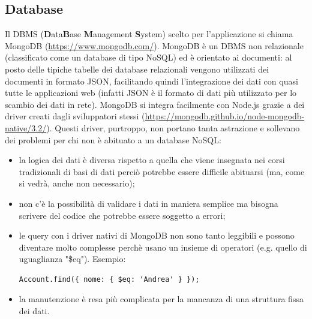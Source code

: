 \documentclass[12pt]{report}
\begin{document}
\subsection{Database}\label{sec:db}
%
Il DBMS (\textbf{D}ata\textbf{B}ase \textbf{M}anagement \textbf{S}ystem) scelto per l'applicazione si chiama MongoDB (\url{https://www.mongodb.com/}). MongoDB è un DBMS non relazionale (classificato come un database di tipo NoSQL) ed è orientato ai documenti: al posto delle tipiche tabelle dei database relazionali vengono utilizzati dei documenti in formato JSON, facilitando quindi l'integrazione dei dati con quasi tutte le applicazioni web (infatti JSON è il formato di dati più utilizzato per lo scambio dei dati in rete).
MongoDB si integra facilmente con Node.js grazie a dei driver creati dagli sviluppatori stessi (\url{https://mongodb.github.io/node-mongodb-native/3.2/}). Questi driver, purtroppo, non portano tanta astrazione e sollevano dei problemi per chi non è abituato a un database NoSQL: 
\begin{itemize}
	\item la logica dei dati è diversa rispetto a quella che viene insegnata nei corsi tradizionali di basi di dati perciò potrebbe essere difficile abituarsi (ma, come si vedrà, anche non necessario);
	\item non c'è la possibilità di validare i dati in maniera semplice ma bisogna scrivere del codice che potrebbe essere soggetto a errori;
	\item le query con i driver nativi di MongoDB non sono tanto leggibili e possono diventare molto complesse perchè usano un insieme di operatori (e.g. quello di uguaglianza "\$eq"). Esempio:
\begin{lstlisting}
Account.find({ nome: { $eq: 'Andrea' } });
\end{lstlisting}
	\item la manutenzione è resa più complicata per la mancanza di una struttura fissa dei dati.
\end{itemize}
\end{document}
